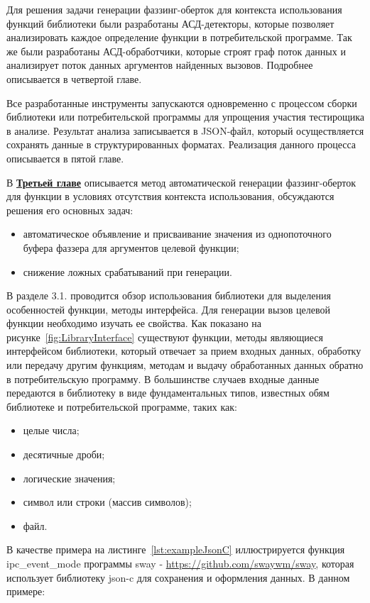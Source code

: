 Для решения задачи генерации фаззинг-оберток для контекста использования функций библиотеки были разработаны АСД-детекторы, которые позволяет анализировать каждое определение функции в потребительской программе. Так же были разработаны АСД-обработчики, которые строят граф поток данных и анализирует поток данных аргументов найденных вызовов. Подробнее описывается в четвертой главе.

Все разработанные инструменты запускаются одновременно с процессом сборки библиотеки или потребительской программы для упрощения участия тестирощика в анализе. Результат анализа записывается в JSON-файл, который осуществляется сохранять данные в структурированных форматах. Реализация данного процесса описывается в пятой главе.

В \underline{\textbf{Третьей главе}} описывается метод автоматической генерации фаззинг-оберток для функции в условиях отсутствия контекста использования, обсуждаются решения его основных задач:
\begin{itemize}
\item автоматическое объявление и присваивание значения из однопоточного буфера фаззера для аргументов целевой функции;
\item снижение ложных срабатываний при генерации.
\end{itemize}

В разделе 3.1. проводится обзор использования библиотеки для выделения особенностей функции, методы интерфейса. Для генерации вызов целевой функции необходимо изучать ее свойства. Как показано на рисунке~\cref{fig:LibraryInterface} существуют функции, методы являющиеся интерфейсом библиотеки, который отвечает за прием входных данных, обработку или передачу другим функциям, методам и выдачу обработанных данных обратно в потребительскую программу. В большинстве случаев входные данные передаются в библиотеку в виде фундаментальных типов, известных обям библиотеке и потребительской программе, таких как:

\begin{itemize}
    \item целые числа;
    \item десятичные дроби;
    \item логические значения;
    \item символ или строки (массив символов);
    \item файл.
\end{itemize}

В качестве примера на листинге~\cref{lst:exampleJsonC} иллюстрируется функция ipc\_event\_mode программы sway - \url{https://github.com/swaywm/sway}, которая использует библиотеку json-c для сохранения и оформления данных. В данном примере:

